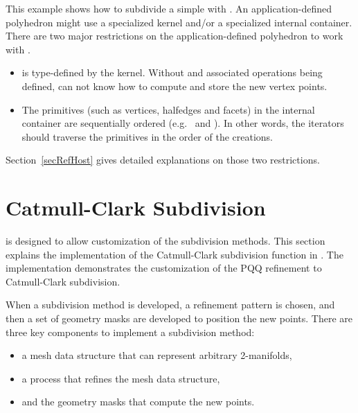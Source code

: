 
This example shows how to subdivide a simple 
with .
An application-defined polyhedron might use a specialized kernel and/or
a specialized internal container. There are two major restrictions on the 
application-defined polyhedron to work with 
.
\begin{itemize}
\item
{} is type-defined by the kernel. Without  
and associated operations being defined,  
can not know how to compute and store the new vertex points.
\item
The primitives (such as vertices, halfedges and facets) 
in the internal container are sequentially ordered (e.g.~
 and ).
In other words, the iterators should traverse the primitives in 
the order of the creations.
\end{itemize}

Section~\ref{secRefHost} gives detailed explanations on those 
two restrictions.

\section{Catmull-Clark Subdivision}
\label{secCC}
 is designed to allow customization of 
the subdivision methods. This section explains the implementation
of the Catmull-Clark subdivision function in .
The implementation demonstrates the customization of the PQQ refinement 
to Catmull-Clark subdivision. 

When a subdivision method is developed, a refinement pattern is 
chosen, and then a set of geometry masks are developed to 
position the new points. There are three key components 
to implement a subdivision method: 
\begin{itemize}
\item
a mesh data structure that can represent arbitrary 2-manifolds, 
\item
a process that refines the mesh data structure, 
\item
and the geometry masks that compute the new points.
\end{itemize}

